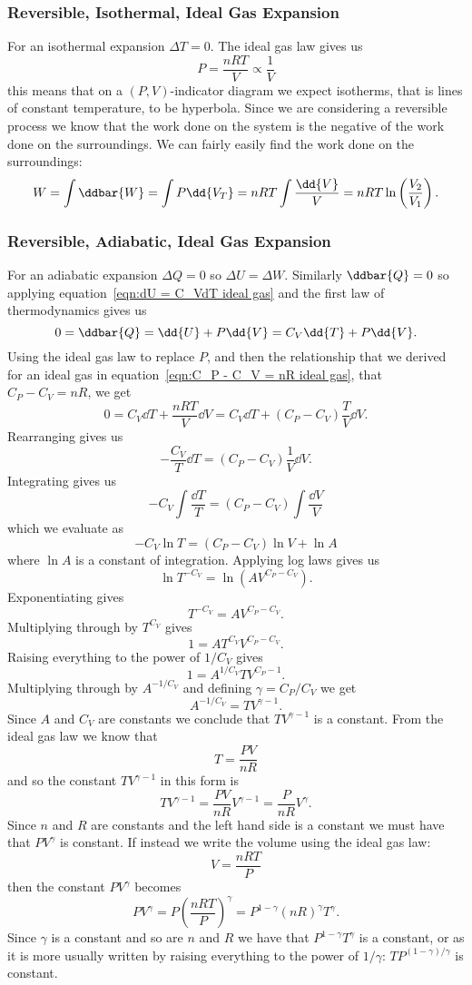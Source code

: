     \subsubsection{Reversible, Isothermal, Ideal Gas Expansion}
    For an isothermal expansion \(\Delta T = 0\).
    The ideal gas law gives us
    \[P = \frac{nRT}{V} \propto \frac{1}{V}\]
    this means that on a \((P, V)\)-indicator diagram we expect isotherms, that is lines of constant temperature, to be hyperbola.
    Since we are considering a reversible process we know that the work done on the system is the negative of the work done on the surroundings.
    We can fairly easily find the work done on the surroundings:
    \[W = \int\ddbar{W} = \int P\dd{V_T} = nRT\int\frac{\dd{V}}{V} = nRT\ln\left(\frac{V_2}{V_1}\right).\]
    
    \subsubsection{Reversible, Adiabatic, Ideal Gas Expansion}
    For an adiabatic expansion \(\Delta Q = 0\) so \(\Delta U = \Delta W\).
    Similarly \(\ddbar{Q} = 0\) so applying equation~\ref{eqn:dU = C_VdT ideal gas} and the first law of thermodynamics gives us
    \[0 = \ddbar{Q} = \dd{U} + P\dd{V} = C_V\dd{T} + P\dd{V}.\]
    Using the ideal gas law to replace \(P\), and then the relationship that we derived for an ideal gas in equation~\ref{eqn:C_P - C_V = nR ideal gas}, that \(C_P - C_V = nR\), we get
    \[0 = C_V\dd{T} + \frac{nRT}{V}\dd{V} = C_V\dd{T} + (C_P - C_V)\frac{T}{V}\dd{V}.\]
    Rearranging gives us
    \[-\frac{C_V}{T}\dd{T} = (C_P - C_V)\frac{1}{V}\dd{V}.\]
    Integrating gives us
    \[-C_V\int\frac{\dd{T}}{T} = (C_P - C_V)\int\frac{\dd{V}}{V}\]
    which we evaluate as
    \[-C_V\ln T = (C_P - C_V)\ln V + \ln A\]
    where \(\ln A\) is a constant of integration.
    Applying log laws gives us
    \[\ln T^{-C_V} = \ln \left(AV^{C_P - C_V}\right).\]
    Exponentiating gives
    \[T^{-C_V} = AV^{C_P - C_V}.\]
    Multiplying through by \(T^{C_V}\) gives
    \[1 = AT^{C_V}V^{C_P - C_V}.\]
    Raising everything to the power of \(1/C_V\) gives
    \[1 = A^{1/C_V}TV^{C_P - 1}.\]
    Multiplying through by \(A^{-1/C_V}\) and defining \(\gamma = C_P/C_V\) we get
    \[A^{-1/C_V} = TV^{\gamma - 1}.\]
    Since \(A\) and \(C_V\) are constants we conclude that \(TV^{\gamma - 1}\) is a constant.
    From the ideal gas law we know that
    \[T = \frac{PV}{nR}\]
    and so the constant \(TV^{\gamma - 1}\) in this form is
    \[TV^{\gamma - 1} = \frac{PV}{nR}V^{\gamma - 1} = \frac{P}{nR}V^\gamma.\]
    Since \(n\) and \(R\) are constants and the left hand side is a constant we must have that \(PV^\gamma\) is constant.
    If instead we write the volume using the ideal gas law:
    \[V = \frac{nRT}{P}\]
    then the constant \(PV^\gamma\) becomes
    \[PV^\gamma = P\left(\frac{nRT}{P}\right)^\gamma = P^{1 - \gamma}(nR)^\gamma T^\gamma.\]
    Since \(\gamma\) is a constant and so are \(n\) and \(R\) we have that \(P^{1-\gamma}T^\gamma\) is a constant, or as it is more usually written by raising everything to the power of \(1/\gamma\): \(TP^{(1 - \gamma)/\gamma}\) is constant.
    
